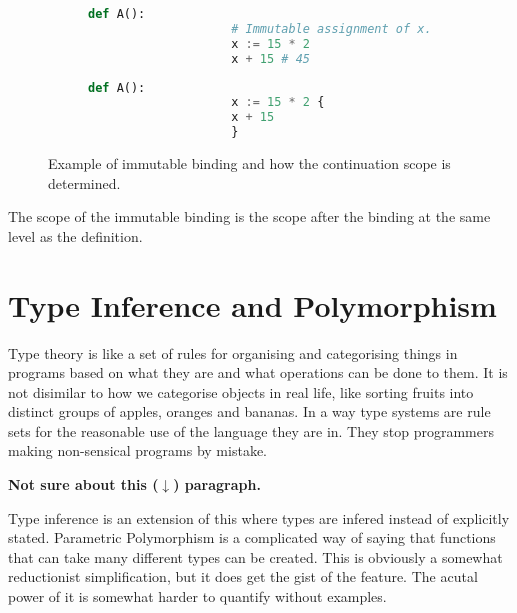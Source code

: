 \documentclass{l4proj}
\begin{document}
\begin{figure}[H]
    \begin{subfigure}{0.45\textwidth}
        \begin{center}
            \begin{lstlisting}[language=Python, keepspaces=true]
                def A():
                    # Immutable assignment of x.
                    x := 15 * 2 
                    x + 15 # 45
            \end{lstlisting}
        \end{center}
    \end{subfigure}
    \begin{subfigure}{0.45\textwidth}
        \begin{center}
            \begin{lstlisting}[language=Python, keepspaces=true]
                def A():
                    x := 15 * 2 {
                    x + 15
                    }      
            \end{lstlisting}
        \end{center}
    \end{subfigure}
    \caption{Example of immutable binding and how the continuation scope is determined.}
    \label{fig:immutable-binding-scope}
\end{figure}

The scope of the immutable binding is the scope after the binding at the same level as the definition.

\section{Type Inference and Polymorphism} \label{sec:type-inference-and-polymorphism}

Type theory is like a set of rules for organising and categorising things in programs based on what they are and what operations can be done to them.
It is not disimilar to how we categorise objects in real life, like sorting fruits into distinct groups of apples, oranges and bananas. In a way type systems are rule sets for the reasonable use of the language they are in.
They stop programmers making non-sensical programs by mistake.

\textbf{Not sure about this ($\downarrow$) paragraph.}

Type inference is an extension of this where types are infered instead of explicitly stated.
Parametric Polymorphism is a complicated way of saying that functions that can take many different types can be created. This is obviously a somewhat reductionist simplification, but it does get the gist of the feature.
The acutal power of it is somewhat harder to quantify without examples.
\end{document}
